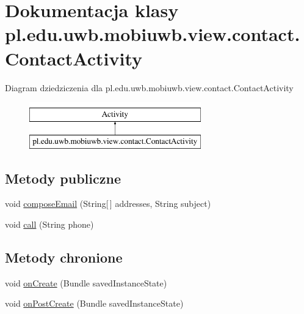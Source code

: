 \hypertarget{classpl_1_1edu_1_1uwb_1_1mobiuwb_1_1view_1_1contact_1_1_contact_activity}{}\section{Dokumentacja klasy pl.\+edu.\+uwb.\+mobiuwb.\+view.\+contact.\+Contact\+Activity}
\label{classpl_1_1edu_1_1uwb_1_1mobiuwb_1_1view_1_1contact_1_1_contact_activity}
Diagram dziedziczenia dla pl.\+edu.\+uwb.\+mobiuwb.\+view.\+contact.\+Contact\+Activity\begin{figure}[H]
\begin{center}
\leavevmode
\includegraphics[height=2.000000cm]{classpl_1_1edu_1_1uwb_1_1mobiuwb_1_1view_1_1contact_1_1_contact_activity}
\end{center}
\end{figure}
\subsection*{Metody publiczne}
\begin{DoxyCompactItemize}
\item 
void \hyperlink{classpl_1_1edu_1_1uwb_1_1mobiuwb_1_1view_1_1contact_1_1_contact_activity_a3885448c563e79e31fee99c35bd9f0fe}{compose\+Email} (String\mbox{[}$\,$\mbox{]} addresses, String subject)
\item 
void \hyperlink{classpl_1_1edu_1_1uwb_1_1mobiuwb_1_1view_1_1contact_1_1_contact_activity_ac2f93b2abdf30686a316c4a76c226971}{call} (String phone)
\end{DoxyCompactItemize}
\subsection*{Metody chronione}
\begin{DoxyCompactItemize}
\item 
void \hyperlink{classpl_1_1edu_1_1uwb_1_1mobiuwb_1_1view_1_1contact_1_1_contact_activity_a5562f171e7d15935f4ad3d937079d8c6}{on\+Create} (Bundle saved\+Instance\+State)
\item 
void \hyperlink{classpl_1_1edu_1_1uwb_1_1mobiuwb_1_1view_1_1contact_1_1_contact_activity_ac987a7c714801d22df3383ab9b5f7fc6}{on\+Post\+Create} (Bundle saved\+Instance\+State)
\end{DoxyCompactItemize}



